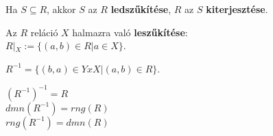 \begin{frame}
\begin{tcolorbox}[title={Def.: Leszűkítés, kierjesztés}]
Ha $S \subseteq R$, akkor $S$ az $R$ \textbf{ledszűkítése}, $R$ az $S$ \textbf{kiterjesztése}.
\end{tcolorbox}

\begin{tcolorbox}[title={Def.: Az $R$ reláció $X$ halmazra való Leszűkítése}]
Az $R$ reláció $X$ halmazra való \textbf{leszűkítése}:\\
$R|_X := \{(a, b) \in R | a \in X \}$.
\end{tcolorbox}

\begin{tcolorbox}[title={Def.: Ar $r \subseteq X x Y$ reláció inverze}]
$R^{-1} = \{(b, a) \in Y x X | (a, b) \in R \}$.
\end{tcolorbox}

\begin{tcolorbox}[title={Ész}]
$(R^{-1})^{-1} = R$\\
$dmn(R^{-1}) = rng(R)$\\
$rng(R^{-1}) = dmn(R)$\\
\end{tcolorbox}
\end{frame}

